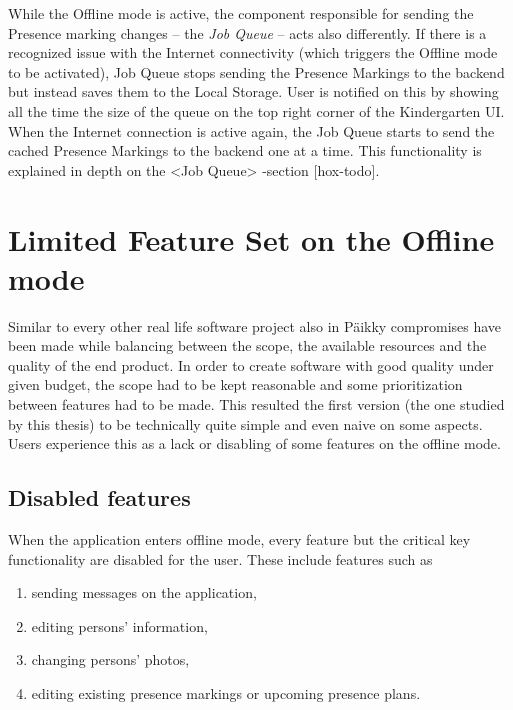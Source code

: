 While the Offline mode is active, the component responsible for sending the Presence marking changes – the \textit{Job Queue} – acts also differently. If there is a recognized issue with the Internet connectivity (which triggers the Offline mode to be activated), Job Queue stops sending the Presence Markings to the backend but instead saves them to the Local Storage. User is notified on this by showing all the time the size of the queue on the top right corner of the Kindergarten UI. When the Internet connection is active again, the Job Queue starts to send the cached Presence Markings to the backend one at a time. This functionality is explained in depth on the <Job Queue> -section [hox-todo]. 





\section{Limited Feature Set on the Offline mode}

Similar to every other real life software project also in Päikky compromises have been made while balancing between the scope, the available resources and the quality of the end product. In order to create software with good quality under given budget, the scope had to be kept reasonable and some prioritization between features had to be made. This resulted the first version (the one studied by this thesis) to be technically quite simple and even naive on some aspects. Users experience this as a lack or disabling of some features on the offline mode.




\subsection{Disabled features}
When the application enters offline mode, every feature but the critical key functionality are disabled for the user. These include features such as

\begin{enumerate}
    \item sending messages on the application,
    \item editing persons' information,
    \item changing persons' photos,
    \item editing existing presence markings or upcoming presence plans.
\end{enumerate}

